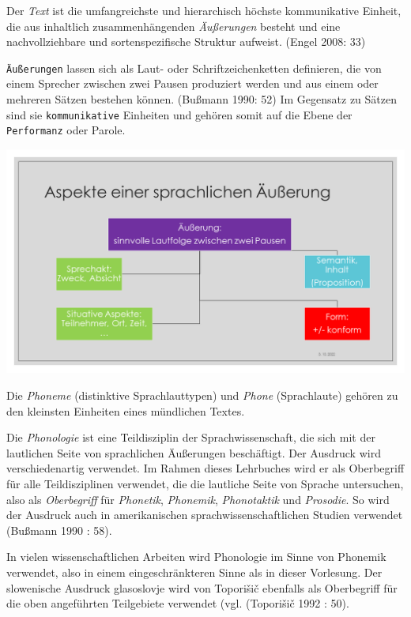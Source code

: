 \documentclass[
  letterpaper,
]{scrbook}
\begin{document}
Der \emph{Text} ist die umfangreichste und hierarchisch höchste
kommunikative Einheit, die aus inhaltlich zusammenhängenden
\emph{Äußerungen} besteht und eine nachvollziehbare und
sortenspezifische Struktur aufweist. (Engel 2008: 33)

\texttt{Äußerungen} lassen sich als Laut- oder Schriftzeichenketten
definieren, die von einem Sprecher zwischen zwei Pausen produziert
werden und aus einem oder mehreren Sätzen bestehen können. (Bußmann
1990: 52) Im Gegensatz zu Sätzen sind sie \texttt{kommunikative}
Einheiten und gehören somit auf die Ebene der \texttt{Performanz} oder
Parole.

\includegraphics[width=1\textwidth,height=\textheight]{./pictures/Diapozitiv10.PNG}

Die \emph{Phoneme} (distinktive Sprachlauttypen) und \emph{Phone}
(Sprachlaute) gehören zu den kleinsten Einheiten eines mündlichen
Textes.

Die \emph{Phonologie} ist eine Teildisziplin der Sprachwissenschaft, die
sich mit der lautlichen Seite von sprachlichen Äußerungen beschäftigt.
Der Ausdruck wird verschiedenartig verwendet. Im Rahmen dieses
Lehrbuches wird er als Oberbegriff für alle Teildisziplinen verwendet,
die die lautliche Seite von Sprache untersuchen, also als
\emph{Oberbegriff} für \emph{Phonetik}, \emph{Phonemik},
\emph{Phonotaktik} und \emph{Prosodie}. So wird der Ausdruck auch in
amerikanischen sprachwissenschaftlichen Studien verwendet (Bußmann 1990
: 58).

In vielen wissenschaftlichen Arbeiten wird Phonologie im Sinne von
Phonemik verwendet, also in einem eingeschränkteren Sinne als in dieser
Vorlesung. Der slowenische Ausdruck glasoslovje wird von Toporišič
ebenfalls als Oberbegriff für die oben angeführten Teilgebiete verwendet
(vgl. (Toporišič 1992 : 50).
\end{document}
